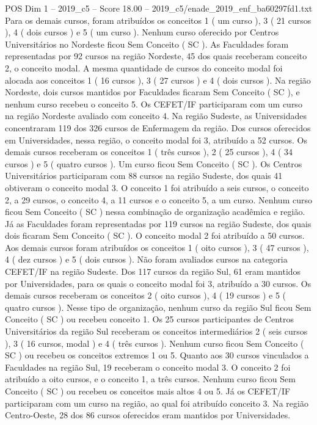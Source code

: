\begin{textsample}{POS Dim 1 – 2019\_c5 – Score 18.00 – 2019\_c5/enade\_2019\_enf\_ba60297fd1.txt}
Para os demais cursos, foram atribuídos os conceitos 1 ( um curso ), 3 ( 21 cursos ), 4 ( dois cursos ) e 5 ( um curso ).
Nenhum curso oferecido por Centros Universitários no Nordeste ficou Sem Conceito ( SC ).
As Faculdades foram representadas por 92 cursos na região Nordeste, 45 dos quais receberam conceito 2, o conceito modal.
A mesma quantidade de cursos do conceito modal foi alocada aos conceitos 1 ( 16 cursos ), 3 ( 27 cursos ) e 4 ( dois cursos ).
Na região Nordeste, dois cursos mantidos por Faculdades ficaram Sem Conceito ( SC ), e nenhum curso recebeu o conceito 5.
Os CEFET/IF participaram com um curso na região Nordeste avaliado com conceito 4.
Na região Sudeste, as Universidades concentraram 119 dos 326 cursos de Enfermagem da região.
Dos cursos oferecidos em Universidades, nessa região, o conceito modal foi 3, atribuído a 52 cursos.
Os demais cursos receberam os conceitos 1 ( três cursos ), 2 ( 25 cursos ), 4 ( 34 cursos ) e 5 ( quatro cursos ).
Um curso ficou Sem Conceito ( SC ).
Os Centros Universitários participaram com 88 cursos na região Sudeste, dos quais 41 obtiveram o conceito modal 3.
O conceito 1 foi atribuído a seis cursos, o conceito 2, a 29 cursos, o conceito 4, a 11 cursos e o conceito 5, a um curso.
Nenhum curso ficou Sem Conceito ( SC ) nessa combinação de organização acadêmica e região.
Já as Faculdades foram representadas por 119 cursos na região Sudeste, dos quais dois ficaram Sem Conceito ( SC ).
O conceito modal 2 foi atribuído a 50 cursos.
Aos demais cursos foram atribuídos os conceitos 1 ( oito cursos ), 3 ( 47 cursos ), 4 ( dez cursos ) e 5 ( dois cursos ).
Não foram avaliados cursos na categoria CEFET/IF na região Sudeste.
Dos 117 cursos da região Sul, 61 eram mantidos por Universidades, para os quais o conceito modal foi 3, atribuído a 30 cursos.
Os demais cursos receberam os conceitos 2 ( oito cursos ), 4 ( 19 cursos ) e 5 ( quatro cursos ).
Nesse tipo de organização, nenhum curso da região Sul ficou Sem Conceito ( SC ) ou recebeu conceito 1.
Os 25 cursos participantes de Centros Universitários da região Sul receberam os conceitos intermediários 2 ( seis cursos ), 3 ( 16 cursos, modal ) e 4 ( três cursos ).
Nenhum curso ficou Sem Conceito ( SC ) ou recebeu os conceitos extremos 1 ou 5.
Quanto aos 30 cursos vinculados a Faculdades na região Sul, 19 receberam o conceito modal 3.
O conceito 2 foi atribuído a oito cursos, e o conceito 1, a três cursos.
Nenhum curso ficou Sem Conceito ( SC ) ou recebeu os conceitos mais altos 4 ou 5.
Já os CEFET/IF participaram com um curso na região, ao qual foi atribuído conceito 3.
Na região Centro-Oeste, 28 dos 86 cursos oferecidos eram mantidos por Universidades.

\end{textsample}

